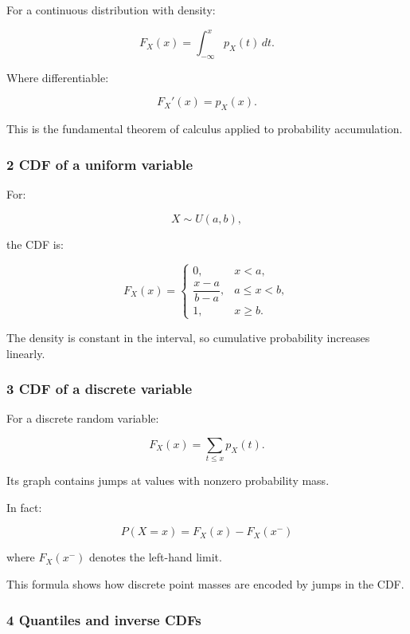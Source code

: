 For a continuous distribution with density:

\[
 \boxed{ F_X(x)=\int_{-\infty}^{x}p_X(t)\,dt }.
\]

Where differentiable:

\[
 \boxed{ F_X'(x)=p_X(x) }.
\]

This is the fundamental theorem of calculus applied to probability accumulation.

\subsubsection{2 CDF of a uniform variable}\label{02-foundations-ii-ch023-cdf-of-a-uniform-variable}

\hypertarget{02-foundations-ii-ch023-cdf-of-a-uniform-variable}{}

For:

\[
 X\sim U(a,b),
\]

the CDF is:

\[
 \boxed{ F_X(x)= \begin{cases} 0,&x<a,\\ \dfrac{x-a}{b-a},&a\le x<b,\\ 1,&x\ge b. \end{cases} }
\]

The density is constant in the interval, so cumulative probability increases linearly.

\subsubsection{3 CDF of a discrete variable}\label{02-foundations-ii-ch023-cdf-of-a-discrete-variable}

\hypertarget{02-foundations-ii-ch023-cdf-of-a-discrete-variable}{}

For a discrete random variable:

\[
 F_X(x)= \sum_{t\le x}p_X(t).
\]

Its graph contains jumps at values with nonzero probability mass.

In fact:

\[
 \boxed{ P(X=x) = F_X(x)-F_X(x^-) }
\]

where \(F_X(x^-)\) denotes the left-hand limit.

This formula shows how discrete point masses are encoded by jumps in the CDF.

\subsubsection{4 Quantiles and inverse CDFs}\label{02-foundations-ii-ch023-quantiles-and-inverse-cdfs}


